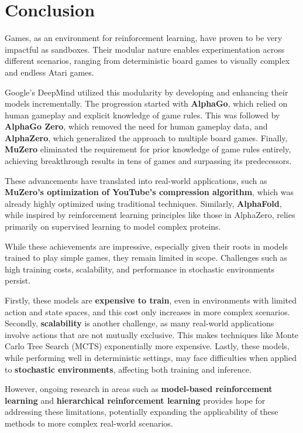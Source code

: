 \section*{Conclusion}

Games, as an environment for reinforcement learning, have proven to be very impactful as sandboxes. Their modular nature enables experimentation across different scenarios, ranging from deterministic board games to visually complex and endless Atari games. 

Google’s DeepMind utilized this modularity by developing and enhancing their models incrementally. The progression started with \textbf{AlphaGo}, which relied on human gameplay and explicit knowledge of game rules. This was followed by \textbf{AlphaGo Zero}, which removed the need for human gameplay data, and \textbf{AlphaZero}, which generalized the approach to multiple board games. Finally, \textbf{MuZero} eliminated the requirement for prior knowledge of game rules entirely, achieving breakthrough results in tens of games and surpassing its predecessors.

These advancements have translated into real-world applications, such as \textbf{MuZero’s optimization of YouTube's compression algorithm}, which was already highly optimized using traditional techniques. Similarly, \textbf{AlphaFold}, while inspired by reinforcement learning principles like those in AlphaZero, relies primarily on supervised learning to model complex proteins. 

While these achievements are impressive, especially given their roots in models trained to play simple games, they remain limited in scope. Challenges such as high training costs, scalability, and performance in stochastic environments persist. 

Firstly, these models are \textbf{expensive to train}, even in environments with limited action and state spaces, and this cost only increases in more complex scenarios. Secondly, \textbf{scalability} is another challenge, as many real-world applications involve actions that are not mutually exclusive. This makes techniques like Monte Carlo Tree Search (MCTS) exponentially more expensive. Lastly, these models, while performing well in deterministic settings, may face difficulties when applied to \textbf{stochastic environments}, affecting both training and inference. 

However, ongoing research in areas such as \textbf{model-based reinforcement learning} and \textbf{hierarchical reinforcement learning} provides hope for addressing these limitations, potentially expanding the applicability of these methods to more complex real-world scenarios.

